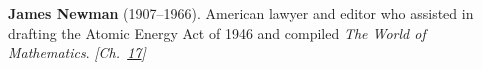 \textbf{James Newman} (1907–1966). American lawyer and editor who assisted in drafting the Atomic Energy Act of 1946 and compiled \emph{The World of Mathematics}. \emph{[Ch.~\hyperref[ch:bignumbers]{17}]}

